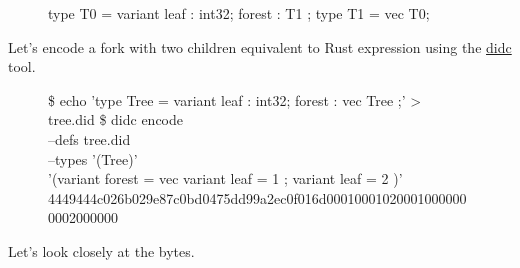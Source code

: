 \documentclass{article}
\begin{document}
\begin{figure}

\begin{code}[candid]
type T0 = variant { leaf : int32; forest : T1 };
type T1 = vec T0;
\end{code}
\end{figure}

Let's encode a fork with two children equivalent to  Rust expression using the \href{https://github.com/dfinity/candid/tree/f7166f47d895e411a74de1eba4b347ac75f5fd26/tools/didc}{didc} tool.

\begin{figure}
\begin{code}[shell]
\$ echo 'type Tree = variant { leaf : int32; forest : vec Tree };' > tree.did
\$ didc encode \\
       --defs   tree.did \\
       --types  '(Tree)' \\
       '(variant { forest = vec { variant { leaf = 1 }; variant { leaf = 2 } } })'
4449444c026b029e87c0bd0475dd99a2ec0f016d000100010200010000000002000000
\end{code}
\end{figure}

Let's look closely at the bytes.
\end{document}
